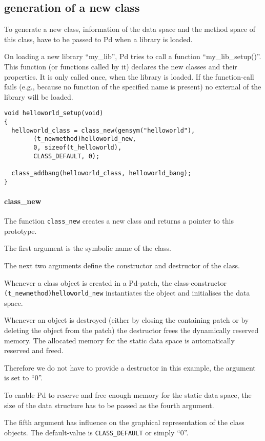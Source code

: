 \documentclass[12pt, a4paper,english,titlepage]{article}
\begin{document}
\subsection{generation of a new class}
To generate a new class, information of the data space and the method space of this class,
have to be passed to Pd when a library is loaded.

On loading a new library ``my\_lib'',
Pd tries to call a function ``my\_lib\_setup()''.
This function (or functions called by it) 
declares the new classes and their properties.
It is only called once, when the library is loaded.
If the function-call fails (e.g., because no function of the specified name is present)
no external of the library will be loaded.

\begin{verbatim}
void helloworld_setup(void)
{
  helloworld_class = class_new(gensym("helloworld"),
        (t_newmethod)helloworld_new,
        0, sizeof(t_helloworld),
        CLASS_DEFAULT, 0);

  class_addbang(helloworld_class, helloworld_bang);
}
\end{verbatim}

\paragraph{class\_new}

The function \verb+class_new+ creates a new class and returns a pointer to this prototype.

The first argument is the symbolic name of the class.

The next two arguments define the constructor and destructor of the class.

Whenever a class object is created in a Pd-patch,
the class-constructor \verb+(t_newmethod)helloworld_new+ instantiates the object
and initialises the data space.

Whenever an object is destroyed
(either by closing the containing patch or by deleting the object from the patch)
the destructor frees the dynamically reserved memory.
The allocated memory for the static data space is automatically reserved and freed.

Therefore we do not have to provide a destructor in this example, the argument
is set to ``0''.

To enable Pd to reserve and free enough memory for the static data space,
the size of the data structure has to be passed as the fourth argument.

The fifth argument has influence on the graphical representation of the class objects.
The default-value is \verb+CLASS_DEFAULT+ or simply ``0''.
\end{document}
